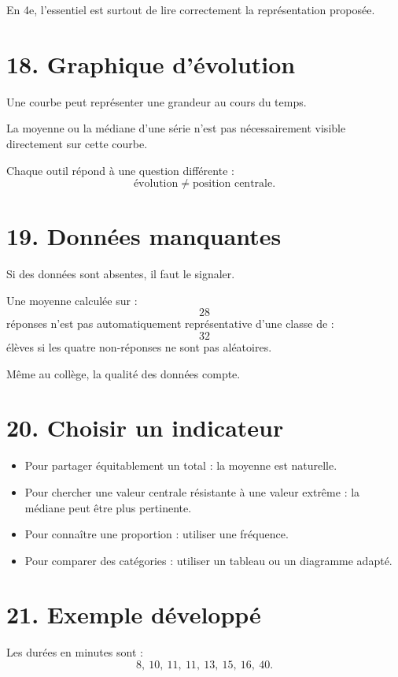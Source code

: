 En 4e, l'essentiel est surtout de lire correctement la représentation proposée.

\section{18. Graphique d'évolution}

Une courbe peut représenter une grandeur au cours du temps.

La moyenne ou la médiane d'une série n'est pas nécessairement visible directement sur cette courbe.

Chaque outil répond à une question différente :
\[
\text{évolution}\neq\text{position centrale}.
\]

\section{19. Données manquantes}

Si des données sont absentes, il faut le signaler.

Une moyenne calculée sur :
\[
28
\]
réponses n'est pas automatiquement représentative d'une classe de :
\[
32
\]
élèves si les quatre non-réponses ne sont pas aléatoires.

Même au collège, la qualité des données compte.

\section{20. Choisir un indicateur}

\begin{methode}
\begin{itemize}
\item Pour partager équitablement un total : la moyenne est naturelle.
\item Pour chercher une valeur centrale résistante à une valeur extrême : la médiane peut être plus pertinente.
\item Pour connaître une proportion : utiliser une fréquence.
\item Pour comparer des catégories : utiliser un tableau ou un diagramme adapté.
\end{itemize}
\end{methode}

\section{21. Exemple développé}

Les durées en minutes sont :
\[
8,\ 10,\ 11,\ 11,\ 13,\ 15,\ 16,\ 40.
\]

